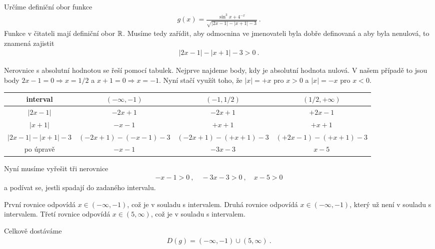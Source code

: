 \begin{example}
    Určíme definiční obor funkce \begin{align*}
        g(x) = \frac{\sin^3 x + 4^{-x}}{\sqrt{|2x-1|-|x+1|-3}} \:.
    \end{align*}
    Funkce v čitateli mají definiční obor $\mathbb{R}$. Musíme tedy zařídit, aby odmocnina ve jmenovateli byla dobře definovaná a aby byla nenulová, to znamená zajistit \begin{align*}
        |2x-1|-|x+1|-3 > 0 \:.
    \end{align*}

    Nerovnice s absolutní hodnotou se řeší pomocí tabulek. Nejprve najdeme body, kdy je absolutní hodnota nulová. V našem případě to jsou body $2x-1 = 0 \Rightarrow x=1/2$ a $x+1=0 \Rightarrow x=-1$. Nyní stačí využít toho, že $|x| = +x$ pro $x>0$ a $|x| = -x$ pro $x<0$.

    \begin{table}[H]
        \centering
        \begin{tabular}{c||c|c|c}
            interval & $(-\infty,-1)$ & $(-1,1/2)$ & $(1/2, +\infty)$ \\
            \hline
            $|2x-1|$ & $-2x+1$ & $-2x+1$ & $+2x-1$ \\
            \hline
            $|x+1|$ & $-x-1$ & $+x+1$ & $+x+1$ \\
            \hline \hline
            $|2x-1|-|x+1|-3$ & $(-2x+1)-(-x-1)-3$ & $(-2x+1)-(+x+1)-3$ & $(+2x-1)-(+x+1)-3$ \\
            \hline
            po úpravě & $-x-1$ & $ -3x - 3$ & $x-5$   
        \end{tabular}
    \end{table}
    Nyní musíme vyřešit tři nerovnice \begin{align*}
        -x-1>0 \:, \quad -3x -3 >0 \:, \quad x-5 > 0 
    \end{align*}
    a podívat se, jestli spadají do zadaného intervalu.

    První rovnice odpovídá $x \in (-\infty,-1)$, což je v souladu s intervalem.
    Druhá rovnice odpovídá $x \in (-\infty,-1)$, který už není v souladu s intervalem.
    Třetí rovnice odpovídá $x \in (5, \infty)$, což je v souladu s intervalem.

    Celkově dostáváme 
    \begin{align*}
        \boxed{ D(g) = (-\infty, -1) \cup (5, \infty) } \:.
    \end{align*}
\end{example}
